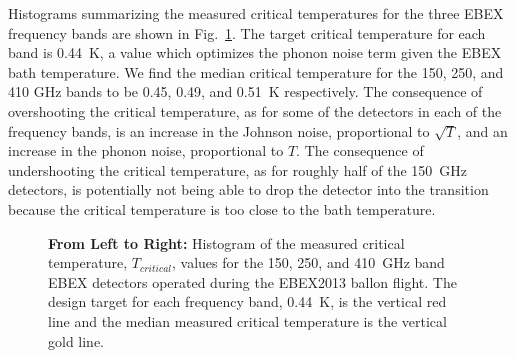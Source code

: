 \documentclass[../EBEXPaper2.tex]{subfiles}
\begin{document}
Histograms summarizing the measured critical temperatures for the three \ac{EBEX} frequency bands are shown in Fig.~\ref{fig:tc_histograms}. 
The target critical temperature for each band is 0.44~K, a value which optimizes the phonon noise term given the \ac{EBEX} bath temperature. %
We find the median critical temperature for the 150, 250, and 410 GHz bands to be 0.45, 0.49, and 0.51~K respectively.  
The consequence of overshooting the critical temperature, as for some of the detectors in each of the frequency bands, is an increase in the Johnson noise, proportional to $\sqrt{T}$, and an increase in the phonon noise, proportional to $T$. 
The consequence of undershooting the critical temperature, as for roughly half of the 150~GHz detectors, is potentially not being able to drop the detector into the transition because the critical temperature is too close to the bath temperature. %

\begin{figure}[ht!]
\centering
{}
\caption{\textbf{From Left to Right:} Histogram of the measured critical temperature, $T_{critical}$, values for the 150, 250, and 410~GHz band \ac{EBEX} detectors operated during the \ac{EBEX2013} ballon flight. The design target for each frequency band, 0.44~K, is the vertical red line and the median measured critical temperature is the vertical gold line. }
\label{fig:tc_histograms}
\end{figure}
\end{document}
